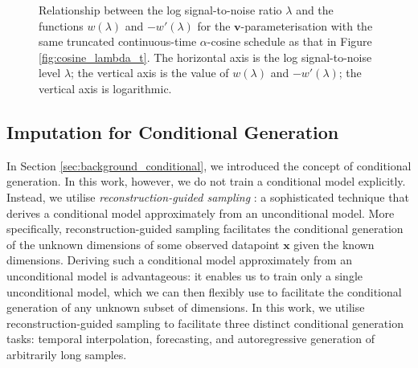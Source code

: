 \documentclass[ oneside,%
                    author={George Herbert},
                    degree={MSci},
                     title={Video Diffusion Models for Climate Simulations},
                  subtitle={}]{dissertation}
\begin{document}
\begin{figure}[htbp]
      \centering
      \caption{Relationship between the log signal-to-noise ratio $\lambda$ and the functions $w(\lambda)$ and $-w'(\lambda)$ for the $\mathbf{v}$-parameterisation with the same truncated continuous-time $\alpha$-cosine schedule as that in Figure \ref{fig:cosine_lambda_t}. The horizontal axis is the log signal-to-noise level $\lambda$; the vertical axis is the value of $w(\lambda)$ and $-w'(\lambda)$; the vertical axis is logarithmic.}
      \label{fig:v_prediction_weighting}
\end{figure}

\subsection{Imputation for Conditional Generation}

In Section \ref{sec:background_conditional}, we introduced the concept of conditional generation. In this work, however, we do not train a conditional model explicitly. Instead, we utilise \textit{reconstruction-guided sampling} \cite{VDM_Ho}: a sophisticated technique that derives a conditional model approximately from an unconditional model. More specifically, reconstruction-guided sampling facilitates the conditional generation of the unknown dimensions of some observed datapoint $\mathbf{x}$ given the known dimensions. Deriving such a conditional model approximately from an unconditional model is advantageous: it enables us to train only a single unconditional model, which we can then flexibly use to facilitate the conditional generation of any unknown subset of dimensions.  In this work, we utilise reconstruction-guided sampling to facilitate three distinct conditional generation tasks: temporal interpolation, forecasting, and autoregressive generation of arbitrarily long samples. 
\end{document}
